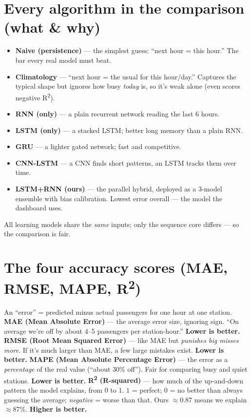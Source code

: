 \documentclass[11pt]{article}
\newcommand{\term}[1]{\noindent\textbf{\color{ink}#1} --- }
\begin{document}
\section{Every algorithm in the comparison (what \& why)}
\begin{itemize}
  \item \textbf{Naive (persistence)} --- the simplest guess: ``next hour = this hour.'' The bar every
        real model must beat.
  \item \textbf{Climatology} --- ``next hour = the usual for this hour/day.'' Captures the typical
        shape but ignores how busy \emph{today} is, so it's weak alone (even scores negative
        R\textsuperscript{2}).
  \item \textbf{RNN (only)} --- a plain recurrent network reading the last 6 hours.
  \item \textbf{LSTM (only)} --- a stacked LSTM; better long memory than a plain RNN.
  \item \textbf{GRU} --- a lighter gated network; fast and competitive.
  \item \textbf{CNN-LSTM} --- a CNN finds short patterns, an LSTM tracks them over time.
  \item \textbf{LSTM+RNN (ours)} --- the parallel hybrid, deployed as a 3-model ensemble with bias
        calibration. Lowest error overall --- the model the dashboard uses.
\end{itemize}
\noindent All learning models share the \emph{same} inputs; only the sequence core differs --- so the
comparison is fair.

\section{The four accuracy scores (MAE, RMSE, MAPE, R\textsuperscript{2})}
An ``error'' = predicted minus actual passengers for one hour at one station.
\term{MAE (Mean Absolute Error)} the average error size, ignoring sign. ``On average we're off by
about 4--5 passengers per station-hour.'' \textbf{Lower is better.}
\term{RMSE (Root Mean Squared Error)} like MAE but \emph{punishes big misses more}. If it's much larger
than MAE, a few large mistakes exist. \textbf{Lower is better.}
\term{MAPE (Mean Absolute Percentage Error)} the error as a \emph{percentage} of the real value
(``about 30\% off''). Fair for comparing busy and quiet stations. \textbf{Lower is better.}
\term{R\textsuperscript{2} (R-squared)} how much of the up-and-down pattern the model explains, from
0 to 1. $1$ = perfect; $0$ = no better than always guessing the average; \emph{negative} = worse than
that. Ours $\approx$0.87 means we explain $\approx$87\%. \textbf{Higher is better.}
\end{document}
